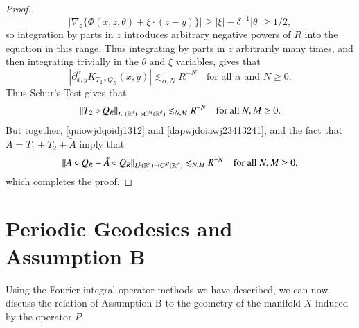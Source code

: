 \begin{proof}
\begin{equation}
    |\nabla_z \{ \Phi(x,z,\theta) + \xi \cdot (z - y) \}| \geq |\xi| - \delta^{-1} |\theta| \geq 1/2,
  \end{equation}
  so integration by parts in $z$ introduces arbitrary negative powers of $R$ into the equation in this range. Thus integrating by parts in $z$ arbitrarily many times, and then integrating trivially in the $\theta$ and $\xi$ variables, gives that
  \begin{equation}
    | \partial_{x,y}^\alpha K_{T_2 \circ Q_R}(x,y) | \lesssim_{\alpha,N} R^{-N} \quad\text{for all $\alpha$ and $N \geq 0$}.
  \end{equation}
  Thus Schur's Test gives that
  \begin{equation} \label{dapwjdoiawj23413241}
    \| T_2 \circ Q_R \|_{L^1(\operatorname{\mathbb{R}}^d) \to C^M(\operatorname{\mathbb{R}}^d)} \lesssim_{N,M} R^{-N} \quad\text{for all $N,M \geq 0$}.
  \end{equation}
  But together, \eqref{quiowjdqoidj1312} and \eqref{dapwjdoiawj23413241}, and the fact that $A = T_1 + T_2 + \tilde{A}$ imply that
  \begin{equation}
    \| A \circ Q_R - \tilde{A} \circ Q_R \|_{L^1(\operatorname{\mathbb{R}}^n) \to C^M(\operatorname{\mathbb{R}}^m)} \lesssim_{N,M} R^{-N} \quad\text{for all $N,M \geq 0$},
  \end{equation}
  which completes the proof.
\end{proof}








\section{Periodic Geodesics and Assumption B} \label{sec:PeriodicGeodesics}

Using the Fourier integral operator methods we have described, we can now discuss the relation of Assumption B to the geometry of the manifold $X$ induced by the operator $P$.

